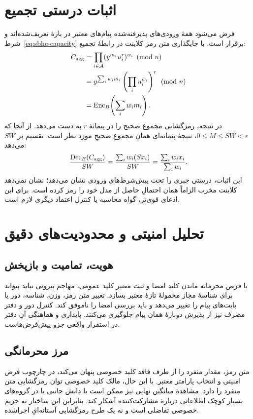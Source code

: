 \section{اثبات درستی تجمیع}
فرض می‌شود همۀ ورودی‌های پذیرفته‌شده پیام‌های معتبر در بازۀ تعریف‌شده‌اند و شرط~\eqref{eq:sbhe-capacity} برقرار است. با جایگذاری متن رمز کلاینت در رابطۀ تجمیع:
\begin{align}
C_{\mathrm{agg}}
&=\prod_{i\in\mathcal A}(y^{m_i}u_i^r)^{w_i}\pmod n\\
&=y^{\sum_iw_im_i}\left(\prod_iu_i^{w_i}\right)^r\pmod n\\
&=\operatorname{Enc}_{B}\!\left(\sum_iw_im_i\right).
\end{align}
در نتیجه، رمزگشایی مجموع صحیح را در پیمانۀ $r$ به دست می‌دهد. از آنجا که $0\le M\le SW<r$، نتیجۀ پیمانه‌ای همان مجموع صحیحِ مورد نظر است. تقسیم بر $SW$ می‌دهد:
\begin{equation}
\frac{\operatorname{Dec}_B(C_{\mathrm{agg}})}{SW}
=\frac{\sum_iw_i(Sx_i)}{SW}
=\frac{\sum_iw_ix_i}{\sum_iw_i}.
\end{equation}
این اثبات، درستی جبری را تحت پیش‌شرط‌های ورودی نشان می‌دهد؛ نشان نمی‌دهد کلاینت مخرب الزاماً همان احتمالِ حاصل از مدل خود را رمز کرده است. برای این ادعای قوی‌تر، گواه محاسبه یا کنترل اعتماد دیگری لازم است.

\section{تحلیل امنیتی و محدودیت‌های دقیق}
\subsection{هویت، تمامیت و بازپخش}
با فرض محرمانه ماندن کلید امضا و ثبت معتبر کلید عمومی، مهاجم بیرونی نباید بتواند برای شناسۀ مجاز محمولۀ تازۀ معتبر بسازد. تغییر متن رمز، وزن، شناسه، دور یا  بایت‌های پیام را تغییر می‌دهد و باید بررسی امضا را ناموفق کند. کنترل دور و دفتر مصرف  نیز از پذیرش دوبارۀ همان پیام جلوگیری می‌کنند. پایداری و هماهنگی آن دفتر در استقرار واقعی جزو پیش‌فرض‌هاست.

\subsection{مرز محرمانگی}
متن رمز، مقدار منفرد را از طرف فاقد کلید خصوصی پنهان می‌کند، در چارچوب فرض امنیتی و انتخاب پارامتر معتبر. با این حال، مالک کلید خصوصی توان رمزگشایی متن منفرد را دارد. مشاهدۀ میانگین نهایی نیز ممکن است با دانش جانبی یا در گروه‌های بسیار کوچک اطلاعاتی دربارۀ مشارکت‌کننده آشکار کند. بنابراین این ساختار نه حریم خصوصی تفاضلی است و نه یک طرح رمزگشایی آستانه‌ایِ اجراشده.


